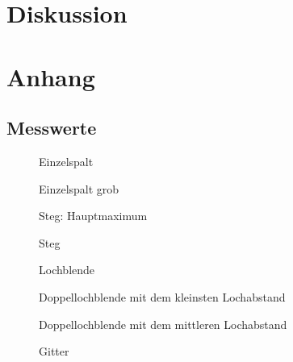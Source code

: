 \documentclass[12pt,a4paper,titlepage,headinclude,bibtotoc]{scrartcl}
\begin{document}
\section{Diskussion}
\label{sec:diskussion}

\section{Anhang}
\subsection{Messwerte}
\begin{figure}[!htb]
	\centering
	
	\caption{Einzelspalt}
\end{figure}

\begin{figure}[!htb]
	\centering
	
	\caption{Einzelspalt grob}
\end{figure}

\begin{figure}[!htb]
	\centering
	
	\caption{Steg: Hauptmaximum}
\end{figure}

\begin{figure}[!htb]
	\centering
	
	\caption{Steg}
\end{figure}

\begin{figure}[!htb]
	\centering
	
	\caption{Lochblende}
\end{figure}

\begin{figure}[!htb]
	\centering
	
	\caption{Doppellochblende mit dem kleinsten Lochabstand}
\end{figure}

\begin{figure}[!htb]
	\centering
	
	\caption{Doppellochblende mit dem mittleren Lochabstand}
\end{figure}

\begin{figure}[!htb]
	\centering
	
	\caption{Gitter}
\end{figure}
\end{document}
